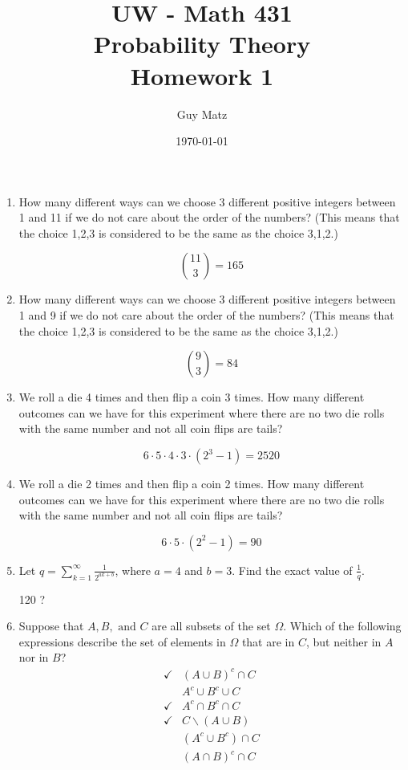 \documentclass[10pt]{article}
\title{UW - Math 431 \\
Probability Theory \\
Homework 1}
\author{Guy Matz}
\date{\today}
\begin{document}
\begin{enumerate}
  \item How many different ways can we choose 3 different positive
    integers between 1 and 11 if we do not care about the order
    of the numbers? (This means that the choice 1,2,3 is considered
    to be the same as the choice 3,1,2.)

    \[ \binom{11}{3} = 165 \]

  \item How many different ways can we choose 3 different positive
    integers between 1 and 9 if we do not care about the order
    of the numbers? (This means that the choice 1,2,3 is considered
    to be the same as the choice 3,1,2.)

    \[ \binom{9}{3} = 84 \]

\newpage
  \item We roll a die 4 times and then flip a coin 3 times. How many
    different outcomes can we have for this experiment where there
    are no two die rolls with the same number and not all coin flips
    are tails?

    \[ 6 \cdot 5 \cdot 4 \cdot 3 \cdot (2^3 - 1) = 2520 \]

  \item We roll a die 2 times and then flip a coin 2 times. How many
    different outcomes can we have for this experiment where there
    are no two die rolls with the same number and not all coin flips
    are tails?

    \[ 6 \cdot 5 \cdot (2^2 - 1) = 90 \]

\newpage
  \item Let $q=\sum_{k=1}^{\infty}\frac{1}{2^{ak+b}}$,
    where $a=4$ and $b=3$.  Find the exact value of $\frac{1}{q}$.

    120 ?

\newpage
  \item Suppose that $A, B, \text{ and } C$ are all subsets of the set 
    $\Omega$.  Which of the following expressions describe the set of
    elements in $\Omega$ that are in $C$, but neither in $A$
    nor in $B$?
    \begin{align}
      \checkmark & (A \cup B)^c \cap C \\
      & A^c \cup B^c \cup C \\
      \checkmark & A^c \cap B^c \cap C \\
      \checkmark & C \backslash(A \cup B) \\
      & \left(A^c \cup B^c\right) \cap C \\
      & (A \cap B)^c \cap C
    \end{align}


\end{enumerate}
\end{document}
